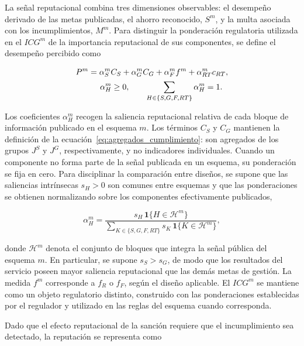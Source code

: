 La señal reputacional combina tres dimensiones observables: el desempeño derivado de las metas publicadas, el ahorro reconocido, \(S^m\), y la multa asociada con los incumplimientos, \(M^m\). Para distinguir la ponderación regulatoria utilizada en el \(ICG^m\) de la importancia reputacional de sus componentes, se define el desempeño percibido como

\begin{equation}
\label{eq:desempeno_percibido}
\begin{aligned}
P^m
&=
\alpha_S^m C_S
+
\alpha_G^m C_G
+
\alpha_F^m f^m
+
\alpha_{RT}^m c_{RT},
\\
&\hspace{0.5cm}
\alpha_H^m\geq0,
\qquad
\sum_{H\in\{S,G,F,RT\}}\alpha_H^m=1.
\end{aligned}
\end{equation}

Los coeficientes \(\alpha_H^m\) recogen la saliencia reputacional relativa de cada bloque de información publicado en el esquema \(m\). Los términos \(C_S\) y \(C_G\) mantienen la definición de la ecuación~\eqref{eq:agregados_cumplimiento}: son agregados de los grupos \(J^S\) y \(J^G\), respectivamente, y no indicadores individuales. Cuando un componente no forma parte de la señal publicada en un esquema, su ponderación se fija en cero. Para disciplinar la comparación entre diseños, se supone que las saliencias intrínsecas \(s_H>0\) son comunes entre esquemas y que las ponderaciones se obtienen normalizando sobre los componentes efectivamente publicados,

\begin{equation}
\label{eq:ponderaciones_reputacionales}
\alpha_H^m
=
\frac{s_H\,\mathbf 1\{H\in\mathcal H^m\}}
{\displaystyle\sum_{K\in\{S,G,F,RT\}}
s_K\,\mathbf 1\{K\in\mathcal H^m\}},
\end{equation}

donde \(\mathcal H^m\) denota el conjunto de bloques que integra la señal pública del esquema \(m\). En particular, se supone \(s_S>s_G\), de modo que los resultados del servicio poseen mayor saliencia reputacional que las demás metas de gestión. La medida \(f^m\) corresponde a \(f_R\) o \(f_F\), según el diseño aplicable. El \(ICG^m\) se mantiene como un objeto regulatorio distinto, construido con las ponderaciones establecidas por el regulador y utilizado en las reglas del esquema cuando corresponda.

Dado que el efecto reputacional de la sanción requiere que el incumplimiento sea detectado, la reputación se representa como

